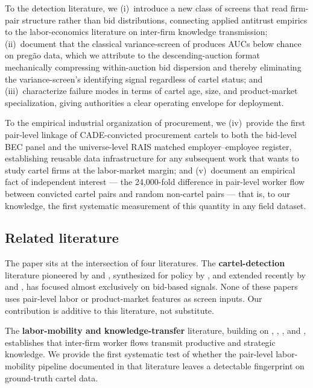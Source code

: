 To the detection literature, we (i)~introduce a new class of screens that read firm-pair structure rather than bid distributions, connecting applied antitrust empirics to the labor-economics literature on inter-firm knowledge transmission; (ii)~document that the classical variance-screen of \citet{abrantesmetz2006screening} produces AUCs below chance on preg\~{a}o data, which we attribute to the descending-auction format mechanically compressing within-auction bid dispersion and thereby eliminating the variance-screen's identifying signal regardless of cartel status; and (iii)~characterize failure modes in terms of cartel age, size, and product-market specialization, giving authorities a clear operating envelope for deployment.

To the empirical industrial organization of procurement, we (iv)~provide the first pair-level linkage of CADE-convicted procurement cartels to both the bid-level BEC panel and the universe-level RAIS matched employer--employee register, establishing reusable data infrastructure for any subsequent work that wants to study cartel firms at the labor-market margin; and (v)~document an empirical fact of independent interest --- the 24{,}000-fold difference in pair-level worker flow between convicted cartel pairs and random non-cartel pairs --- that is, to our knowledge, the first systematic measurement of this quantity in any field dataset.

\subsection*{Related literature}

The paper sits at the intersection of four literatures. The \textbf{cartel-detection} literature pioneered by \citet{porter1993detection, porter1999detection} and \citet{bajari2003deciding}, synthesized for policy by \citet{harrington2008detecting_effects}, and extended recently by \citet{kawai2022detecting} and \citet{chassang2022robust}, has focused almost exclusively on bid-based signals. None of these papers uses pair-level labor or product-market features as screen inputs. Our contribution is additive to this literature, not substitute.

The \textbf{labor-mobility and knowledge-transfer} literature, building on \citet{cardheiningkline2013}, \citet{sorkin2018ranking}, \citet{jarosch2021learning}, and \citet{stoyanov2012worker}, establishes that inter-firm worker flows transmit productive and strategic knowledge. We provide the first systematic test of whether the pair-level labor-mobility pipeline documented in that literature leaves a detectable fingerprint on ground-truth cartel data.

